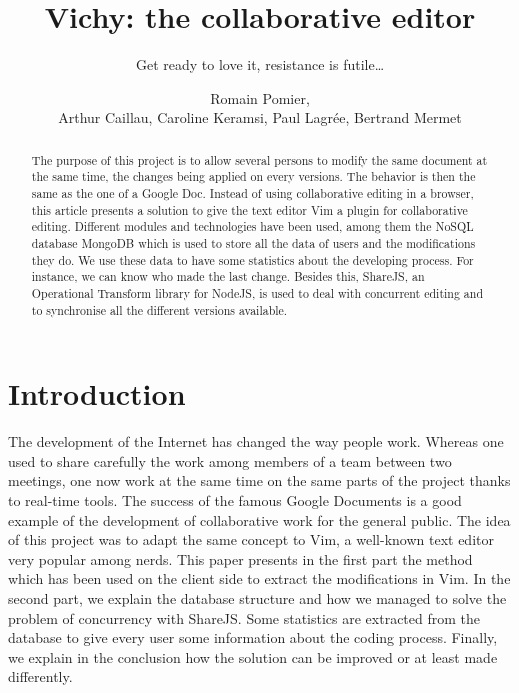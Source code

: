 \documentclass{llncs}
\begin{document}
\title{Vichy: the collaborative editor}
\subtitle{Get ready to love it, resistance is futile\ldots}

\author{Romain Pomier,\\Arthur Caillau, Caroline Keramsi, Paul Lagrée, Bertrand Mermet}

\maketitle

\begin{abstract}

The purpose of this project is to allow several persons to modify the same
document at the same time, the changes being applied on every versions.
The behavior is then the same as the one of a Google Doc.
Instead of using collaborative editing in a browser, this article presents a
solution to give the text editor Vim a plugin for collaborative editing.
Different modules and technologies have been used, among them the NoSQL
database MongoDB which is used to store all the data of users and the
modifications they do.
We use these data to have some statistics about the developing process.
For instance, we can know who made the last change. Besides this, ShareJS, an
Operational Transform library for NodeJS, is used to deal with concurrent
editing and to synchronise all the different versions available.

\end{abstract}

\section{Introduction}\label{sec:Introduction}

The development of the Internet has changed the way people work.
Whereas one used to share carefully the work among members of a team between
two meetings, one now work at the same time on the same parts of the project
thanks to real-time tools.
The success of the famous Google Documents is a good example of the development
of collaborative work for the general public.
The idea of this project was to adapt the same concept to Vim, a well-known
text editor very popular among nerds.
This paper presents in the first part the method which has been used on the
client side to extract the modifications in Vim.
In the second part, we explain the database structure and how we managed to
solve the problem of concurrency with ShareJS.
Some statistics are extracted from the database to give every user some
information about the coding process.
Finally, we explain in the conclusion how the solution can be improved or at
least made differently.
\end{document}
